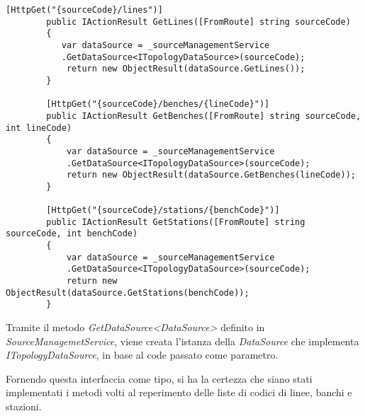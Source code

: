 \begin{lstlisting}[caption={TopologyController.cs}, style=javaScriptCode]
        [HttpGet("{sourceCode}/lines")]
        public IActionResult GetLines([FromRoute] string sourceCode)
        {
           var dataSource = _sourceManagementService
           .GetDataSource<ITopologyDataSource>(sourceCode);
            return new ObjectResult(dataSource.GetLines());
        }

        [HttpGet("{sourceCode}/benches/{lineCode}")]
        public IActionResult GetBenches([FromRoute] string sourceCode, int lineCode)
        {
            var dataSource = _sourceManagementService
            .GetDataSource<ITopologyDataSource>(sourceCode);
            return new ObjectResult(dataSource.GetBenches(lineCode));
        }

        [HttpGet("{sourceCode}/stations/{benchCode}")]
        public IActionResult GetStations([FromRoute] string sourceCode, int benchCode)
        {
            var dataSource = _sourceManagementService
            .GetDataSource<ITopologyDataSource>(sourceCode);
            return new ObjectResult(dataSource.GetStations(benchCode));
        }
\end{lstlisting}
Tramite il metodo \textit{GetDataSource<DataSource>} definito in \textit{SourceManagemetService}, viene creata l'istanza della \textit{DataSource} che implementa \textit{ITopologyDataSource}, in base al code passato come parametro.

Fornendo questa interfaccia come tipo, si ha la certezza che siano stati implementati i metodi volti al reperimento delle liste di codici di linee, banchi e stazioni.
\newpage